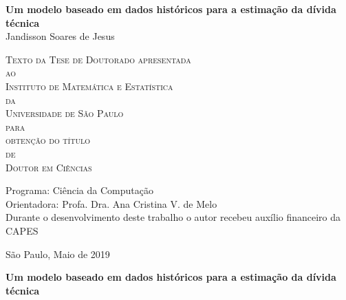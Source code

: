 \documentclass[11pt,twoside,a4paper]{book}
\begin{document}
\frontmatter 
\fancyhead[RO]{{\footnotesize\rightmark}\hspace{2em}\thepage}
\setcounter{tocdepth}{2}
\fancyhead[LE]{\thepage\hspace{2em}\footnotesize{\leftmark}}
\fancyhead[RE,LO]{}
\fancyhead[RO]{{\footnotesize\rightmark}\hspace{2em}\thepage}

\onehalfspacing  %

\thispagestyle{empty}
\begin{center}
    \vspace*{2.3cm}
    \textbf{\Large{Um modelo baseado em dados históricos para a estimação da dívida técnica}}\\
    
    \vspace*{1.2cm}
    \Large{Jandisson Soares de Jesus}
    
    \vskip 2cm
    \textsc{
    Texto da Tese de Doutorado apresentada\\[-0.25cm] 
    ao\\[-0.25cm]
    Instituto de Matemática e Estatística\\[-0.25cm]
    da\\[-0.25cm]
    Universidade de São Paulo\\[-0.25cm]
    para\\[-0.25cm]
    obtenção do título\\[-0.25cm]
    de\\[-0.25cm]
    Doutor em Ciências}
    
    \vskip 1.5cm
    Programa: Ciência da Computação\\
    Orientadora: Profa. Dra. Ana Cristina V. de Melo\\


   	\vskip 1cm
    \normalsize{Durante o desenvolvimento deste trabalho o autor recebeu auxílio
    financeiro da CAPES}
    
    \vskip 0.5cm
    \normalsize{São Paulo, Maio de 2019}
\end{center}

%
%
%
\newpage
\thispagestyle{empty}
    \begin{center}
        \vspace*{2.3 cm}
        \textbf{\Large{Um modelo baseado em dados históricos para a estimação da dívida técnica}}\\
        \vspace*{2 cm}
    \end{center}
\end{document}
